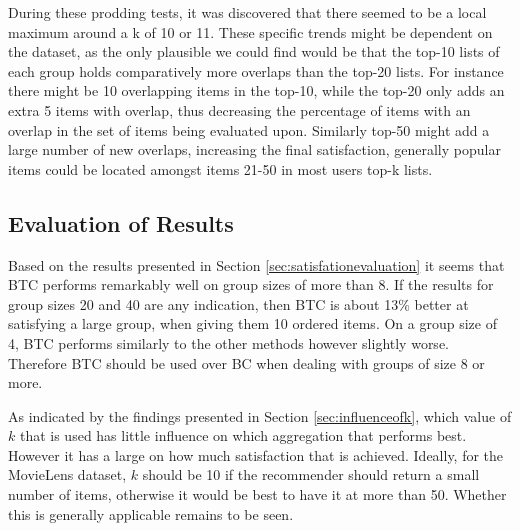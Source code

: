 During these prodding tests, it was discovered that there seemed to be a local maximum around a k of 10 or 11. These specific trends might be dependent on the dataset, as the only plausible we could find would be that the top-10 lists of each group holds comparatively more overlaps than the top-20 lists. For instance there might be 10 overlapping items in the top-10, while the top-20 only adds an extra 5 items with overlap, thus decreasing the percentage of items with an overlap in the set of items being evaluated upon. Similarly top-50 might add a large number of new overlaps, increasing the final satisfaction, generally popular items could be located amongst items 21-50 in most users top-k lists.

\subsection{Evaluation of Results} \label{sec:evaluationofresults}
Based on the results presented in Section \ref{sec:satisfationevaluation} it seems that BTC performs remarkably well on group sizes of more than 8. If the results for group sizes 20 and 40 are any indication, then BTC is about 13\% better at satisfying a large group, when giving them 10 ordered items. On a group size of 4, BTC performs similarly to the other methods however slightly worse. Therefore BTC should be used over BC when dealing with groups of size 8 or more.

As indicated by the findings presented in Section \ref{sec:influenceofk}, which value of $k$ that is used has little influence on which aggregation that performs best. However it has a large on how much satisfaction that is achieved. Ideally, for the MovieLens dataset, $k$ should be 10 if the recommender should return a small number of items, otherwise it would be best to have it at more than 50. Whether this is generally applicable remains to be seen.
